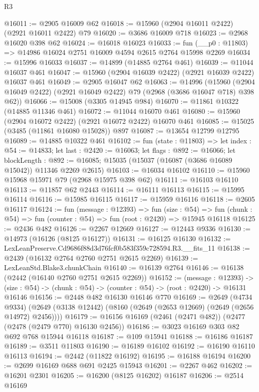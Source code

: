\begin{lexlean}{R3}
\begin{coremodule}
@16011 := @2905 @16009 @62
@16018 := @15960 (@2904 @16011 @2422) (@2921 @16011 @2422) @79
@16020 := @3686 @16009 @718
@16023 := @2968 @16020 @398 @62
@16024 := @16018 @16023
@16033 := fun (__p0 : @11803) => @14986 @16024 @2751 @16009 @4594 @2615 @2764 @15998 @2269
@16034 := @15996 @16033
@16037 := @14899 (@14885 @2764 @461)
@16039 := @11044 @16037 @461
@16047 := @15960 (@2904 @16039 @2422) (@2921 @16039 @2422) @16037 @461
@16049 := @2905 @16047 @62
@16063 := @14996
    (@15960 (@2904 @16049 @2422) (@2921 @16049 @2422) @79 (@2968 (@3686 @16047 @718) @398 @62))
@16066 := @15008 (@3305 @14945 @984)
@16070 := @11861 @10322 (@14885 @11346 @461)
@16072 := @11044 @16070 @461
@16080 := @15960 (@2904 @16072 @2422) (@2921 @16072 @2422) @16070 @461
@16085 := @15025 (@3485 (@11861 @16080 @15028)) @897
@16087 := @13654 @12799 @12795
@16089 := @14885 @10322 @461
@16102 := fun (state : @11803) =>
  let index : @54 := @14833;
  let last : @2420 := @16063;
  let flags : @892 := @16066;
  let blockLength : @892 := @16085;
  @15035 (@15037 (@16087 (@3686 @16089 @15042)) @11346 @2269 @2615)
@16103 := @16034 @16102
@16110 := @15960 @15968 @15971 @79 (@2968 @15975 @398 @62)
@16111 := @16103 @16110
@16113 := @11857 @62 @2443
@16114 := @16111 @16113
@16115 := @15995 @16114
@16116 := @15985 @16115
@16117 := @15959 @16116
@16118 := @2605 @16117
@16124 := fun (message : @12393) =>
  fun (size : @54) =>
  fun (chunk : @54) => fun (counter : @54) => fun (root : @2420) => @15945 @16118
@16125 := @2436 @482
@16126 := @2267 @12669
@16127 := @12443 @9336
@16130 := @14973 (@16126 (@8125 @16127))
@16131 := @16125 @16130
@16132 := LexLeanPreserve.Cd9686f88d3d76fcf0b583f359c728594.R3.__fits_11
@16138 := @2439 (@16132 @2764 @2760 @2751 @2615 @2269)
@16139 := LexLeanStd.Blake3.chunkChain
@16140 := @16139 @2764
@16146 := @16138 (@2442 (@16140 @2760 @2751 @2615 @2269))
@16152 := (message : @12393) ->
  (size : @54) -> (chunk : @54) -> (counter : @54) -> (root : @2420) -> @16131 @16146
@16156 := @2448 @482 @16130 @16146 @770
@16169 := @2649
    (@4734 @9334)
    (@2649 (@3138 @12442) (@8160 (@2649 (@2653 @12669) (@2649 (@2656 @14972) @2456))))
@16179 := @16156 @16169 (@2461 (@2471 @482)) (@2477 (@2478 (@2479 @770) @16130 @2456))
@16186 := @3023 @16169 @303 @82 @692 @768 @15944 @16118
@16187 := @109 @15941
@16188 := @16186 @16187
@16189 := @3511 @11803
@16190 := @16189 @16102
@16192 := @16190 @16110 @16113
@16194 := @2442 (@11822 @16192)
@16195 := @16188 @16194
@16200 := @2699 @16169 @688 @691 @2425 @15943
@16201 := @2267 @462
@16202 := @16201 @2301
@16205 := @16200 (@8125 @16202) @16187
@16206 := @2514 @16169

\end{coremodule}
\end{lexlean}
